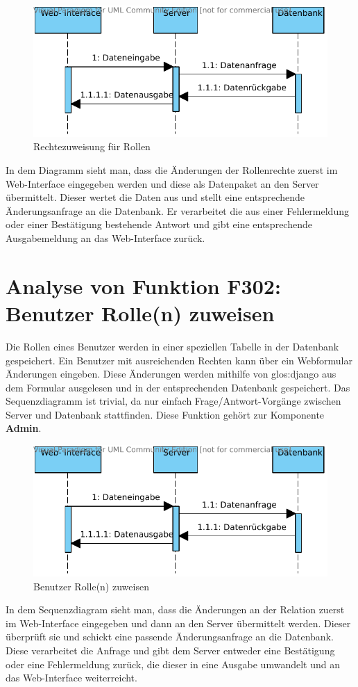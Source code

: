 \begin{figure}[H]
\includegraphics[width=0.8\linewidth]{bilder/f300.pdf}
\caption[Rechtezuweisung für Rollen]{Rechtezuweisung für Rollen}
\label{fig:301}
\end{figure}

In dem Diagramm sieht man, dass die Änderungen der Rollenrechte zuerst im
Web-Interface eingegeben werden und diese als Datenpaket an den Server
übermittelt. Dieser wertet die Daten aus und stellt eine entsprechende
Änderungsanfrage an die Datenbank. Er verarbeitet die aus einer Fehlermeldung
oder einer Bestätigung bestehende Antwort und gibt eine entsprechende
Ausgabemeldung an das Web-Interface zurück.

\section{Analyse von Funktion F302: Benutzer Rolle(n) zuweisen}
Die Rollen eines Benutzer werden in einer speziellen Tabelle in der Datenbank gespeichert. Ein Benutzer mit ausreichenden Rechten kann über ein Webformular Änderungen eingeben. Diese Änderungen werden mithilfe von \gls{glos:django} aus dem Formular ausgelesen und in der entsprechenden Datenbank gespeichert. Das Sequenzdiagramm ist trivial, da nur einfach Frage/Antwort-Vorgänge zwischen Server und Datenbank stattfinden. Diese Funktion gehört zur Komponente \textbf{Admin}.

\begin{figure}[H]
\includegraphics[width=0.8\linewidth]{bilder/f302.pdf}
\caption[Benutzer Rolle(n) zuweisen]{Benutzer Rolle(n) zuweisen}
\label{fig:302}
\end{figure}

In dem Sequenzdiagram sieht man, dass die Änderungen an der Relation zuerst im
Web-Interface eingegeben und dann an den Server übermittelt werden. Dieser
überprüft sie und schickt eine passende Änderungsanfrage an die Datenbank.
Diese verarbeitet die Anfrage und gibt dem Server entweder eine Bestätigung
oder eine Fehlermeldung zurück, die dieser in eine Ausgabe umwandelt und an das
Web-Interface weiterreicht.
